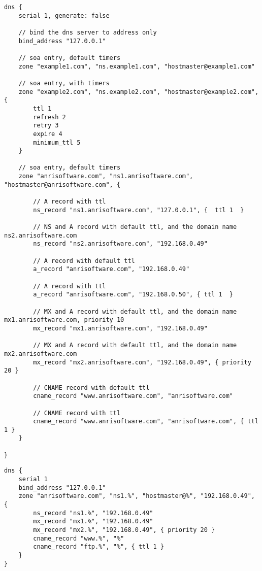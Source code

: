\begin{lstlisting}[style=Java,label=lst:dns_example_script,
title={Dns example script.}]
dns {
    serial 1, generate: false

    // bind the dns server to address only
    bind_address "127.0.0.1"

    // soa entry, default timers
    zone "example1.com", "ns.example1.com", "hostmaster@example1.com"

    // soa entry, with timers
    zone "example2.com", "ns.example2.com", "hostmaster@example2.com", {
        ttl 1
        refresh 2
        retry 3
        expire 4
        minimum_ttl 5
    }

    // soa entry, default timers
    zone "anrisoftware.com", "ns1.anrisoftware.com", "hostmaster@anrisoftware.com", {

        // A record with ttl
        ns_record "ns1.anrisoftware.com", "127.0.0.1", {  ttl 1  }

        // NS and A record with default ttl, and the domain name ns2.anrisoftware.com
        ns_record "ns2.anrisoftware.com", "192.168.0.49"

        // A record with default ttl
        a_record "anrisoftware.com", "192.168.0.49"

        // A record with ttl
        a_record "anrisoftware.com", "192.168.0.50", { ttl 1  }

        // MX and A record with default ttl, and the domain name mx1.anrisoftware.com, priority 10
        mx_record "mx1.anrisoftware.com", "192.168.0.49"

        // MX and A record with default ttl, and the domain name mx2.anrisoftware.com
        mx_record "mx2.anrisoftware.com", "192.168.0.49", { priority 20 }

        // CNAME record with default ttl
        cname_record "www.anrisoftware.com", "anrisoftware.com"

        // CNAME record with ttl
        cname_record "www.anrisoftware.com", "anrisoftware.com", { ttl 1 }
    }

}
\end{lstlisting}

\begin{lstlisting}[style=Java,label=lst:dns_example_min_script,
title={Dns service minimumal example script using the zone placeholder.}]
dns {
    serial 1
    bind_address "127.0.0.1"
    zone "anrisoftware.com", "ns1.%", "hostmaster@%", "192.168.0.49", {
        ns_record "ns1.%", "192.168.0.49"
        mx_record "mx1.%", "192.168.0.49"
        mx_record "mx2.%", "192.168.0.49", { priority 20 }
        cname_record "www.%", "%"
        cname_record "ftp.%", "%", { ttl 1 }
    }
}
\end{lstlisting}


